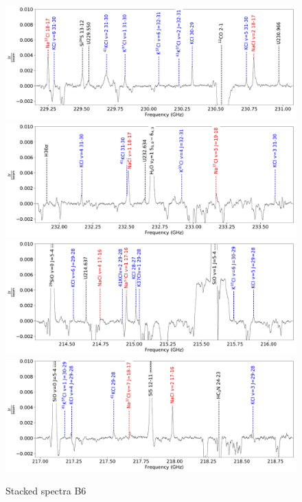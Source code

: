 \documentclass[twocolumn]{aastex62}
\begin{document}
\begin{figure}[!htp]
\includegraphics[scale=1,width=5.5in]{figures/color_labels_OrionSourceI_B6_spw0_robust0.5.pdf}
\includegraphics[scale=1,width=5.5in]{figures/color_labels_OrionSourceI_B6_spw1_robust0.5.pdf}
\includegraphics[scale=1,width=5.5in]{figures/color_labels_OrionSourceI_B6_spw2_robust0.5.pdf}
\includegraphics[scale=1,width=5.5in]{figures/color_labels_OrionSourceI_B6_spw3_robust0.5.pdf}
\caption{Stacked spectra B6}
\label{fig:spectrab6}
\end{figure}
\end{document}
